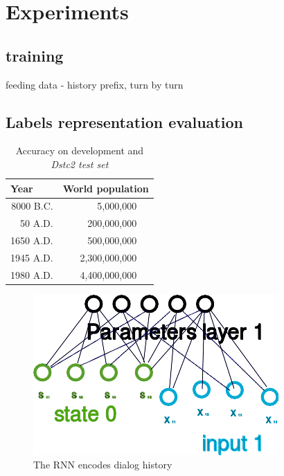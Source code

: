 \documentclass{itatnew}
\begin{document}
\section{Experiments}

\subsection{training}
feeding data - history prefix, turn by turn

\subsection{Labels representation evaluation}

\begin{table}
\caption{Accuracy on development and {\it Dstc2 test set }}
\begin{center}
\begin{tabular}{r@{\quad}rl}
\hline
\multicolumn{1}{l}{\rule{0pt}{12pt}
                   Year}&\multicolumn{2}{l}{World population}\\[2pt]
\hline\rule{0pt}{12pt}
8000 B.C.  &     5,000,000& \\
  50 A.D.  &   200,000,000& \\
1650 A.D.  &   500,000,000& \\
1945 A.D.  & 2,300,000,000& \\
1980 A.D.  & 4,400,000,000& \\[2pt]
\hline
\end{tabular}
\end{center}
\end{table}


\begin{figure}
\includegraphics[width=\textwidth]{rnn}
\caption{The RNN encodes dialog history}
\end{figure}
\end{document}
